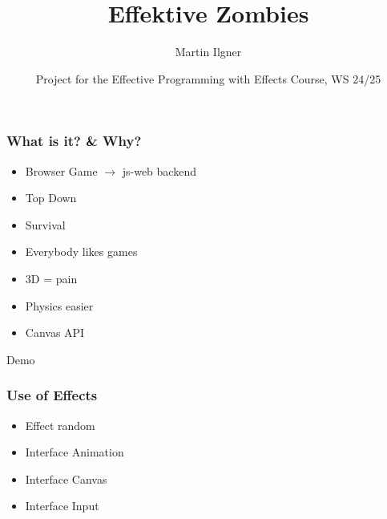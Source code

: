 \documentclass{beamer}
\title{Effektive Zombies}
\author{Martin Ilgner}
\institute{University of Tübingen}
\date{Project for the Effective Programming with Effects Course, WS 24/25}
\begin{document}
	
	\frame{\titlepage}
	
	\begin{frame}
		\frametitle{What is it? \& Why?}
		\begin{Large}
		\begin{itemize}
			\setlength{\itemsep}{.5em}
			\item Browser Game $\rightarrow$ js-web backend
			\item Top Down 
			\item Survival
			\item<2-> Everybody likes games
			\item<3-> 3D = pain
			\item<3-> Physics easier
			\item<4-> Canvas API
		\end{itemize}
		\end{Large}
	\end{frame}
	
	\begin{frame}[plain, c]
		\begin{center}
			\Huge Demo
		\end{center}
	\end{frame}
	
	\begin{frame}
		\frametitle{Use of Effects}
		\begin{Large}
		\begin{itemize}
			\setlength{\itemsep}{1em}
			\item Effect random
			\item Interface Animation
			\item Interface Canvas
			\item Interface Input
		\end{itemize}
		\end{Large}
	\end{frame}
	
	
	
\end{document}
